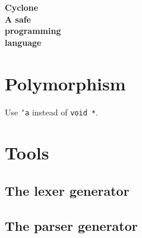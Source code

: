 \documentclass[12pt]{article}
\begin{document}
\thispagestyle{empty}
\textcolor{bluegray}{
\begin{center}
  \bfseries\fontsize{.7in}{.8in}\selectfont
  {\fontsize{1.5in}{1.6in}\selectfont Cyclone}\\[1ex]
  A safe\\
  programming\\
  language
\end{center}
}
\newpage
\tableofcontents
\newpage







\section{Polymorphism}
\hypertarget{polymorphism}{}

Use \texttt{`a} instead of \texttt{void *}.




\appendix





\section{Tools}

\subsection{The lexer generator}
\subsection{The parser generator}

\printindex
\end{document}
